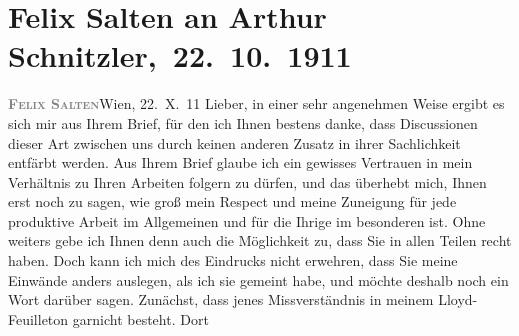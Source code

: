 

         
         \renewcommand{\erwaehntePersonen}{Personen: Felix Salten, Ottilie Salten, Olga Schnitzler}
         \renewcommand{\erwaehnteOrte}{Orte: Berlin, Wien}
         \renewcommand{\erwaehnteWerke}{Werke: Burgtheater. »Das weite Land.« Tragikomödie von Arthur Schnitzler, Das weite Land. Tragikomödie in fünf Akten, Der gute König Dagobert. Lustspiel in vier Aufzügen}
               \section[ Felix Salten an Arthur Schnitzler, 22. 10. 1911]{ Felix Salten an Arthur Schnitzler, 22. 10. 1911}\nopagebreak{}\rehead{ }\begin{ledgroupsized}[t]{13cm}\normalsize\beginnumbering{} \toendnotes[C]{\smallbreak\pagebreak[2]} 
\toendnotes[C]{\smallbreak}\pstart
           \noindent{}{\pb}\textcolor{gray}{\textbf{\textsc{Felix Salten}}}\hfill Wien, 22. X. 11\pend
           \pstart
           Lieber, in einer sehr angenehmen Weise ergibt es sich mir aus Ihrem
               Brief, für den ich Ihnen bestens danke, dass Discussionen dieser Art zwischen uns
               durch keinen anderen Zusatz in ihrer Sachlichkeit entfärbt werden. Aus Ihrem Brief
               glaube ich ein gewisses Vertrauen in mein Verhältnis zu Ihren Arbeiten folgern zu
               dürfen, und das überhebt mich, Ihnen erst noch zu sagen, wie groß mein Respect und
               meine Zuneigung für jede produktive Arbeit im Allgemeinen und für die Ihrige im
               besonderen ist. Ohne weiters gebe ich Ihnen denn auch die Möglichkeit zu, dass Sie in
               allen Teilen recht haben. Doch kann ich mich des Eindrucks nicht erwehren, dass Sie
               meine Einwände anders auslegen, als ich sie gemeint habe, und möchte deshalb noch ein
               Wort darüber sagen. Zunächst, dass jenes Missverständnis in meinem Lloyd-Feuilleton garnicht besteht. Dort

\end{ledgroupsized}
